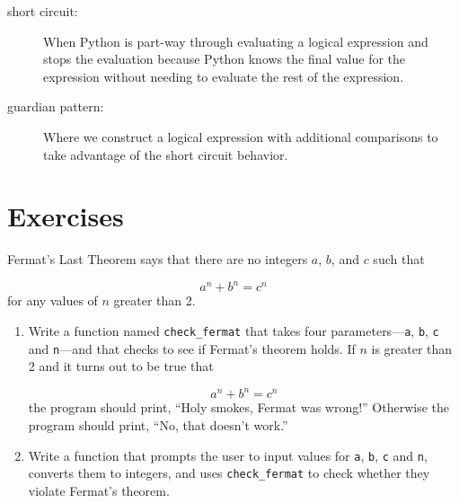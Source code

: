 \documentclass[10pt]{book}
\begin{document}
\begin{description}
\item[short circuit:]  When Python is part-way through evaluating a 
logical expression and stops the evaluation because Python 
knows the final value for the expression 
without needing to evaluate the rest of the expression.

\item[guardian pattern:] Where we construct a logical expression with additional
comparisons to take advantage of the short circuit behavior.

\end{description}

\section{Exercises}

\begin{ex}

Fermat's Last Theorem says that there are no integers
$a$, $b$, and $c$ such that

\[ a^n + b^n = c^n \]
%
for any values of $n$ greater than 2.

\begin{enumerate}

\item Write a function named \verb"check_fermat" that takes four
parameters---{\tt a}, {\tt b}, {\tt c} and {\tt n}---and
that checks to see if Fermat's theorem holds.  If
$n$ is greater than 2 and it turns out to be true that 

\[a^n + b^n = c^n \]
%
the program should print, ``Holy smokes, Fermat was wrong!''
Otherwise the program should print, ``No, that doesn't work.''

\item Write a function that prompts the user to input values
for {\tt a}, {\tt b}, {\tt c} and {\tt n}, converts them to
integers, and uses \verb"check_fermat" to check whether they
violate Fermat's theorem.

\end{enumerate}

\end{ex}
\end{document}
